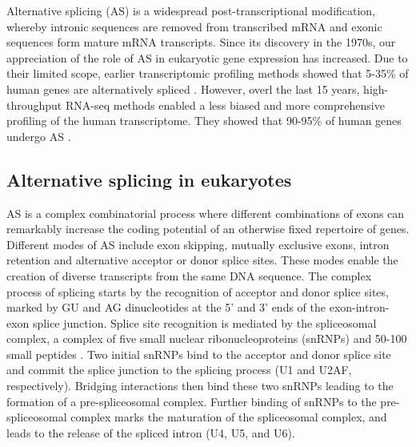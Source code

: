 Alternative splicing (AS) is a widespread post-transcriptional modification, whereby intronic sequences are removed from transcribed mRNA and exonic sequences form mature mRNA transcripts. Since its discovery in the 1970s, our appreciation of the role of AS in eukaryotic gene expression has increased. Due to their limited scope, earlier transcriptomic profiling methods showed that 5-35\% of human genes are alternatively spliced \cite{Sharp1994-nz,Mironov1999-qo}. However, overl the last 15 years, high-throughput RNA-seq methods enabled a less biased and more comprehensive profiling of the human transcriptome. They showed that 90-95\% of human genes undergo AS \cite{Pan2008-qe}. 

\subsection{Alternative splicing in eukaryotes}

AS is a complex combinatorial process where different combinations of exons can remarkably increase the coding potential of an otherwise fixed repertoire of genes. Different modes of AS include exon skipping, mutually exclusive exons, intron retention and alternative acceptor or donor splice sites. These modes enable the creation of diverse transcripts from the same DNA sequence. The complex process of splicing starts by the recognition of acceptor and donor splice sites, marked by GU and AG dinucleotides at the 5' and 3' ends of the exon-intron-exon splice junction. Splice site recognition is mediated by the spliceosomal complex, a complex of five small nuclear ribonucleoproteins (snRNPs) and 50-100 small peptides \cite{Kramer1996-qj}. Two initial snRNPs bind to the acceptor and donor splice site and commit the splice junction to the splicing process (U1 and U2AF, respectively). Bridging interactions then bind these two snRNPs leading to the formation of a pre-spliceosomal complex. Further binding of snRNPs to the pre-spliceosomal complex marks the maturation of the spliceosomal complex, and leads to the release of the spliced intron (U4, U5, and U6).\\



